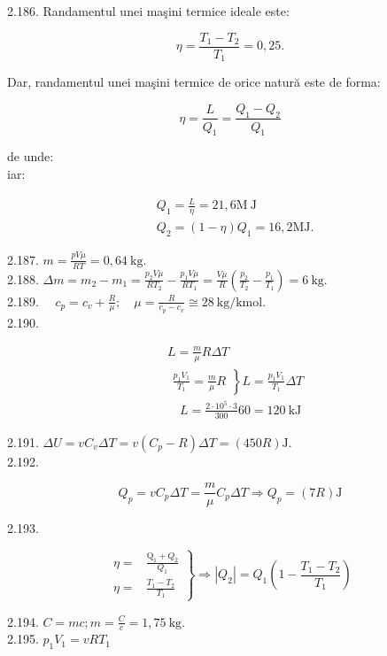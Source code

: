 \documentclass[10pt]{article}
\begin{document}
2.186. Randamentul unei maşini termice ideale este:

$$
\eta=\frac{T_{1}-T_{2}}{T_{1}}=0,25 .
$$

Dar, randamentul unei maşini termice de orice natură este de forma:

$$
\eta=\frac{L}{Q_{1}}=\frac{Q_{1}-Q_{2}}{Q_{1}}
$$

de unde:\\
iar:

$$
\begin{aligned}
& Q_{1}=\frac{L}{\eta}=21,6 \mathrm{M} \mathrm{~J} \\
& Q_{2}=(1-\eta) Q_{1}=16,2 \mathrm{MJ} .
\end{aligned}
$$

2.187. $m=\frac{p V \mu}{R T}=0,64 \mathrm{~kg}$.\\
2.188. $\Delta m=m_{2}-m_{1}=\frac{p_{2} V \mu}{R T_{2}}-\frac{p_{1} V \mu}{R T_{1}}=\frac{V \mu}{R}\left(\frac{p_{2}}{T_{2}}-\frac{p_{1}}{T_{1}}\right)=6 \mathrm{~kg}$.\\
2.189. $\quad c_{p}=c_{v}+\frac{R}{\mu} ; \quad \mu=\frac{R}{c_{p}-c_{v}} \cong 28 \mathrm{~kg} / \mathrm{kmol}$.\\
2.190.

$$
\begin{aligned}
& L=\frac{m}{\mu} R \Delta T \\
& \left.\begin{array}{l}
\frac{p_{1} V_{1}}{T_{1}}=\frac{m}{\mu} R
\end{array}\right\} L=\frac{p_{1} V_{1}}{T_{1}} \Delta T \\
& \quad L=\frac{2 \cdot 10^{5} \cdot 3}{300} 60=120 \mathrm{~kJ}
\end{aligned}
$$

2.191. $\Delta U=v C_{v} \Delta T=v\left(C_{p}-R\right) \Delta T=(450 R) \mathrm{J}$.\\
2.192.

$$
Q_{p}=v C_{p} \Delta T=\frac{m}{\mu} C_{p} \Delta T \Rightarrow Q_{p}=(7 R) \mathrm{J}
$$

2.193.

$$
\left.\begin{array}{rl}
\eta= & \frac{\mathrm{Q}_{1}+Q_{2}}{Q_{1}} \\
\eta= & \frac{T_{1}-T_{2}}{T_{1}}
\end{array}\right\} \Rightarrow\left|Q_{2}\right|=Q_{1}\left(1-\frac{T_{1}-T_{2}}{T_{1}}\right)
$$

2.194. $C=m c ; m=\frac{C}{c}=1,75 \mathrm{~kg}$.\\
2.195. $p_{1} V_{1}=v R T_{1}$
\end{document}
